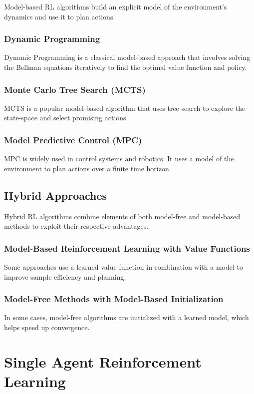Model-based RL algorithms build an explicit model of the environment's dynamics and use it to plan actions.

\subsubsection{Dynamic Programming}
Dynamic Programming is a classical model-based approach that involves solving the Bellman equations iteratively to find the optimal value function and policy.

\subsubsection{Monte Carlo Tree Search (MCTS)}
MCTS is a popular model-based algorithm that uses tree search to explore the state-space and select promising actions.

\subsubsection{Model Predictive Control (MPC)}
MPC is widely used in control systems and robotics. It uses a model of the environment to plan actions over a finite time horizon.

\subsection{Hybrid Approaches}

Hybrid RL algorithms combine elements of both model-free and model-based methods to exploit their respective advantages.

\subsubsection{Model-Based Reinforcement Learning with Value Functions}
Some approaches use a learned value function in combination with a model to improve sample efficiency and planning.

\subsubsection{Model-Free Methods with Model-Based Initialization}
In some cases, model-free algorithms are initialized with a learned model, which helps speed up convergence.
\section{Single Agent Reinforcement Learning}\label{sec:single-agent-reinforcement-learning}
